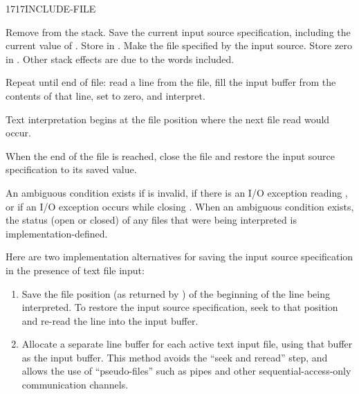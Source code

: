 \begin{worddef}{1717}{INCLUDE-FILE}
\item {}

	Remove  from the stack. Save the current input
	source specification, including the current value of
	. Store  in .
	Make the file specified by  the input source. Store
	zero in . Other stack effects are due to the
	words included.

	Repeat until end of file: read a line from the file, fill the
	input buffer from the contents of that line, set 
	to zero, and interpret.

	Text interpretation begins at the file position where the next
	file read would occur.

	When the end of the file is reached, close the file and restore
	the input source specification to its saved value.

	An ambiguous condition exists if  is invalid, if
	there is an I/O exception reading , or if an I/O
	exception occurs while closing . When an ambiguous
	condition exists, the status (open or closed) of any files that
	were being interpreted is {im\-ple\-ment\-ation-de\-fin\-ed}.


	\begin{rationale} %
		Here are two implementation alternatives for saving the input
		source specification in the presence of text file input:

		\begin{enumerate}
		\item[1)] Save the file position (as returned by
			) of the beginning of the line being
			interpreted. To restore the input source specification,
			seek to that position and re-read the line into the input
			buffer.

		\item[2)] Allocate a separate line buffer for each active text
			input file, using that buffer as the input buffer. This
			method avoids the ``seek and reread'' step, and allows the
			use of ``pseudo-files'' such as pipes and other
			sequential-access-only communication channels.
		\end{enumerate}
	\end{rationale}
\end{worddef}

